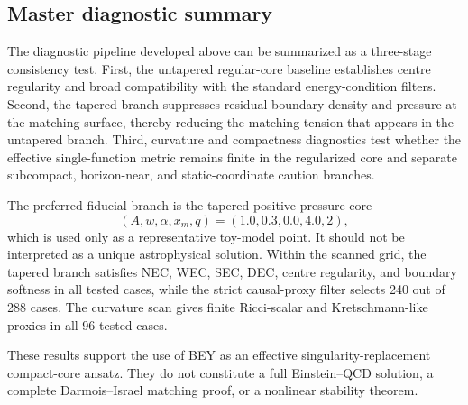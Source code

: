 \subsection{Master diagnostic summary}
\label{subsec:master_diagnostic_summary}

The diagnostic pipeline developed above can be summarized as a three-stage
consistency test. First, the untapered regular-core baseline establishes centre
regularity and broad compatibility with the standard energy-condition filters.
Second, the tapered branch suppresses residual boundary density and pressure at
the matching surface, thereby reducing the matching tension that appears in the
untapered branch. Third, curvature and compactness diagnostics test whether the
effective single-function metric remains finite in the regularized core and
separate subcompact, horizon-near, and static-coordinate caution branches.

The preferred fiducial branch is the tapered positive-pressure core
\[
(A,w,\alpha,x_m,q)=(1.0,0.3,0.0,4.0,2),
\]
which is used only as a representative toy-model point. It should not be
interpreted as a unique astrophysical solution. Within the scanned grid, the
tapered branch satisfies NEC, WEC, SEC, DEC, centre regularity, and boundary
softness in all tested cases, while the strict causal-proxy filter selects
240 out of 288 cases. The curvature scan gives finite Ricci-scalar and
Kretschmann-like proxies in all 96 tested cases.

These results support the use of BEY as an effective singularity-replacement
compact-core ansatz. They do not constitute a full Einstein--QCD solution, a
complete Darmois--Israel matching proof, or a nonlinear stability theorem.
